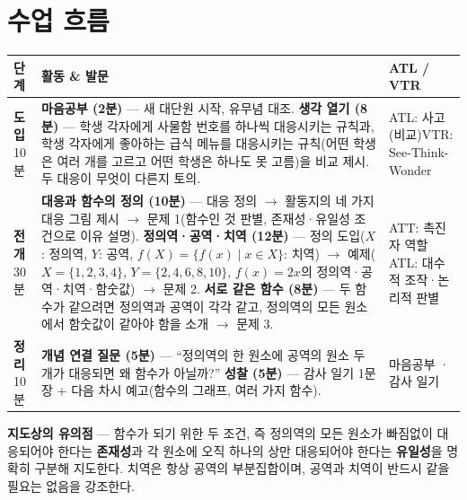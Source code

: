\documentclass[11pt,a4paper]{article}
\begin{document}
\section{수업 흐름}
\begin{tabularx}{\linewidth}{@{}>{\centering\arraybackslash}p{1.6cm}X>{\raggedright\arraybackslash\small}p{3.1cm}@{}}
\toprule
\textbf{단계} & \textbf{활동 \& 발문} & \textbf{ATL / VTR} \\
\midrule
\textcolor{goldstrong}{\textbf{도입}}\newline\footnotesize 10분 &
\textbf{마음공부 (2분)} --- 새 대단원 시작, 유무념 대조.\newline
\textbf{생각 열기 (8분)} --- 학생 각자에게 사물함 번호를 하나씩 대응시키는 규칙과, 학생 각자에게 좋아하는 급식 메뉴를 대응시키는 규칙(어떤 학생은 여러 개를 고르고 어떤 학생은 하나도 못 고름)을 비교 제시. 두 대응이 무엇이 다른지 토의. &
ATL: 사고(비교)\newline VTR: See-Think-Wonder \\
\addlinespace
\textcolor{goldstrong}{\textbf{전개}}\newline\footnotesize 30분 &
\textbf{대응과 함수의 정의 (10분)} --- 대응 정의 $\to$ 활동지의 네 가지 대응 그림 제시 $\to$ 문제 1(함수인 것 판별, 존재성·유일성 조건으로 이유 설명).\newline
\textbf{정의역·공역·치역 (12분)} --- 정의 도입($X$: 정의역, $Y$: 공역, $f(X)=\{f(x)\mid x\in X\}$: 치역) $\to$ 예제($X=\{1,2,3,4\}$, $Y=\{2,4,6,8,10\}$, $f(x)=2x$의 정의역·공역·치역·함숫값) $\to$ 문제 2.\newline
\textbf{서로 같은 함수 (8분)} --- 두 함수가 같으려면 정의역과 공역이 각각 같고, 정의역의 모든 원소에서 함숫값이 같아야 함을 소개 $\to$ 문제 3. &
ATT: 촉진자 역할\newline ATL: 대수적 조작·논리적 판별 \\
\addlinespace
\textcolor{goldstrong}{\textbf{정리}}\newline\footnotesize 10분 &
\textbf{개념 연결 질문 (5분)} --- ``정의역의 한 원소에 공역의 원소 두 개가 대응되면 왜 함수가 아닐까?''\newline
\textbf{성찰 (5분)} --- 감사 일기 1문장 + 다음 차시 예고(함수의 그래프, 여러 가지 함수). &
마음공부 · 감사 일기 \\
\bottomrule
\end{tabularx}

\begin{calloutbox}
\textbf{지도상의 유의점} --- 함수가 되기 위한 두 조건, 즉 정의역의 모든 원소가 빠짐없이 대응되어야 한다는 \textbf{존재성}과 각 원소에 오직 하나의 상만 대응되어야 한다는 \textbf{유일성}을 명확히 구분해 지도한다. 치역은 항상 공역의 부분집합이며, 공역과 치역이 반드시 같을 필요는 없음을 강조한다.
\end{calloutbox}
\end{document}
